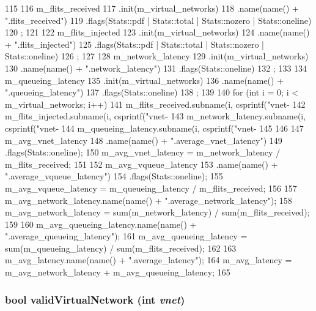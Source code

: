 \begin{DoxyCode}
115 {
116     m_flits_received
117         .init(m_virtual_networks)
118         .name(name() + ".flits_received")
119         .flags(Stats::pdf | Stats::total | Stats::nozero | Stats::oneline)
120         ;
121 
122     m_flits_injected
123         .init(m_virtual_networks)
124         .name(name() + ".flits_injected")
125         .flags(Stats::pdf | Stats::total | Stats::nozero | Stats::oneline)
126         ;
127 
128     m_network_latency
129         .init(m_virtual_networks)
130         .name(name() + ".network_latency")
131         .flags(Stats::oneline)
132         ;
133 
134     m_queueing_latency
135         .init(m_virtual_networks)
136         .name(name() + ".queueing_latency")
137         .flags(Stats::oneline)
138         ;
139 
140     for (int i = 0; i < m_virtual_networks; i++) {
141         m_flits_received.subname(i, csprintf("vnet-%
142         m_flits_injected.subname(i, csprintf("vnet-%
143         m_network_latency.subname(i, csprintf("vnet-%
144         m_queueing_latency.subname(i, csprintf("vnet-%
145     }
146 
147     m_avg_vnet_latency
148         .name(name() + ".average_vnet_latency")
149         .flags(Stats::oneline);
150     m_avg_vnet_latency = m_network_latency / m_flits_received;
151 
152     m_avg_vqueue_latency
153         .name(name() + ".average_vqueue_latency")
154         .flags(Stats::oneline);
155     m_avg_vqueue_latency = m_queueing_latency / m_flits_received;
156 
157     m_avg_network_latency.name(name() + ".average_network_latency");
158     m_avg_network_latency = sum(m_network_latency) / sum(m_flits_received);
159 
160     m_avg_queueing_latency.name(name() + ".average_queueing_latency");
161     m_avg_queueing_latency = sum(m_queueing_latency) / sum(m_flits_received);
162 
163     m_avg_latency.name(name() + ".average_latency");
164     m_avg_latency = m_avg_network_latency + m_avg_queueing_latency;
165 }
\end{DoxyCode}
\hypertarget{classBaseGarnetNetwork_adf94d17da461ce5960923fec76cf70b5}{
\subsubsection[{validVirtualNetwork}]{\setlength{\rightskip}{0pt plus 5cm}bool validVirtualNetwork (int {\em vnet})}}
\label{classBaseGarnetNetwork_adf94d17da461ce5960923fec76cf70b5}




